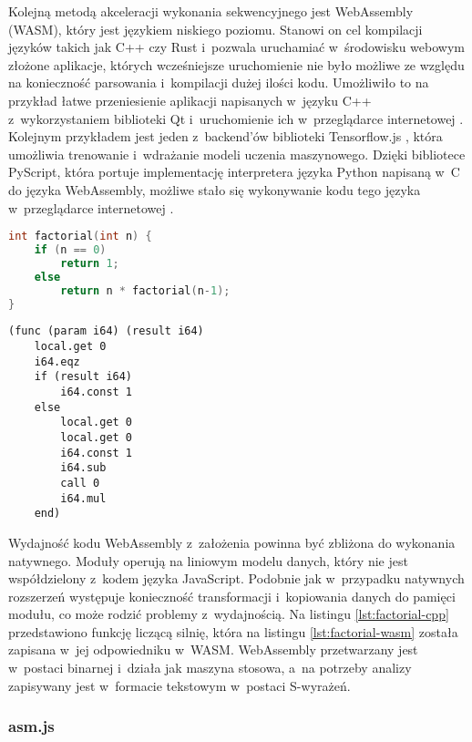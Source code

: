 Kolejną metodą akceleracji wykonania sekwencyjnego jest WebAssembly (WASM), który jest językiem niskiego poziomu. Stanowi on cel kompilacji języków takich jak C++ czy Rust i~pozwala uruchamiać w~środowisku webowym złożone aplikacje, których wcześniejsze uruchomienie nie było możliwe ze względu na konieczność parsowania i~kompilacji dużej ilości kodu. Umożliwiło to na przykład łatwe przeniesienie aplikacji napisanych w~języku C++ z~wykorzystaniem biblioteki Qt i~uruchomienie ich w~przeglądarce internetowej \cite{qt-wasm}. Kolejnym przykładem jest jeden z~backend'ów biblioteki Tensorflow.js \cite{tensorflowjs}, która umożliwia trenowanie i~wdrażanie modeli uczenia maszynowego. Dzięki bibliotece PyScript, która portuje implementację interpretera języka Python napisaną w~C do języka WebAssembly, możliwe stało się wykonywanie kodu tego języka w~przeglądarce internetowej \cite{pyscript}.

\begin{lstlisting}[language=C++, caption=Funkcja licząca silnię w~języku C/C++, label=lst:factorial-cpp]
int factorial(int n) {
    if (n == 0)
        return 1;
    else
        return n * factorial(n-1);
}
\end{lstlisting}
    
\begin{lstlisting}[language=WASM,float=ht, caption=Funkcja licząca silnię w~języku WASM, label=lst:factorial-wasm]
(func (param i64) (result i64)
    local.get 0
    i64.eqz
    if (result i64)
        i64.const 1
    else
        local.get 0
        local.get 0
        i64.const 1
        i64.sub
        call 0
        i64.mul
    end)
\end{lstlisting}

Wydajność kodu WebAssembly z~założenia powinna być zbliżona do wykonania natywnego. Moduły operują na liniowym modelu danych, który nie jest współdzielony z~kodem języka JavaScript. Podobnie jak w~przypadku natywnych rozszerzeń występuje konieczność transformacji i~kopiowania danych do pamięci modułu, co może rodzić problemy z~wydajnością. Na listingu \ref{lst:factorial-cpp} przedstawiono funkcję liczącą silnię, która na listingu \ref{lst:factorial-wasm} została zapisana w~jej odpowiedniku w~WASM. WebAssembly przetwarzany jest w~postaci binarnej i~działa jak maszyna stosowa, a~na potrzeby analizy zapisywany jest w~formacie tekstowym w~postaci S-wyrażeń.

\subsubsection{asm.js}

